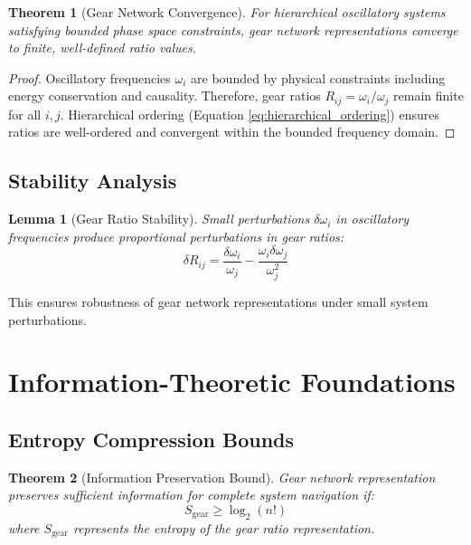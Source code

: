 \documentclass[12pt,a4paper]{article}
\newtheorem{theorem}{Theorem}
\newtheorem{lemma}{Lemma}
\begin{document}
\begin{theorem}[Gear Network Convergence]
For hierarchical oscillatory systems satisfying bounded phase space constraints, gear network representations converge to finite, well-defined ratio values.
\end{theorem}

\begin{proof}
Oscillatory frequencies $\omega_i$ are bounded by physical constraints including energy conservation and causality. Therefore, gear ratios $R_{ij} = \omega_i/\omega_j$ remain finite for all $i,j$. Hierarchical ordering (Equation \ref{eq:hierarchical_ordering}) ensures ratios are well-ordered and convergent within the bounded frequency domain.
\end{proof}

\subsection{Stability Analysis}

\begin{lemma}[Gear Ratio Stability]
Small perturbations $\delta\omega_i$ in oscillatory frequencies produce proportional perturbations in gear ratios:
\begin{equation}
\delta R_{ij} = \frac{\delta\omega_i}{\omega_j} - \frac{\omega_i \delta\omega_j}{\omega_j^2}
\label{eq:stability_perturbation}
\end{equation}
\end{lemma}

This ensures robustness of gear network representations under small system perturbations.

\section{Information-Theoretic Foundations}

\subsection{Entropy Compression Bounds}

\begin{theorem}[Information Preservation Bound]
Gear network representation preserves sufficient information for complete system navigation if:
\begin{equation}
S_{\text{gear}} \geq \log_2(n!)
\label{eq:preservation_bound}
\end{equation}
where $S_{\text{gear}}$ represents the entropy of the gear ratio representation.
\end{theorem}
\end{document}
